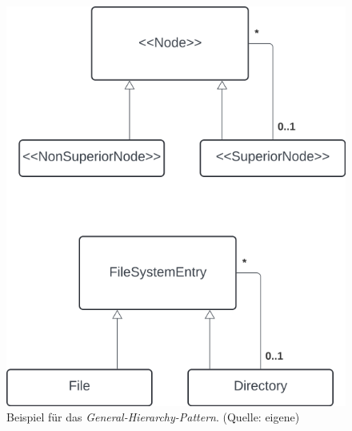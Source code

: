 \begin{figure}
    \centering
    \includegraphics[scale=0.3]{part two/Objektorientierte Analyse/img/generalhierarchy}
    \caption{Beispiel für das \textit{General-Hierarchy-Pattern}. (Quelle: eigene)}
    \label{fig:generalhierarchy_cc}
\end{figure}